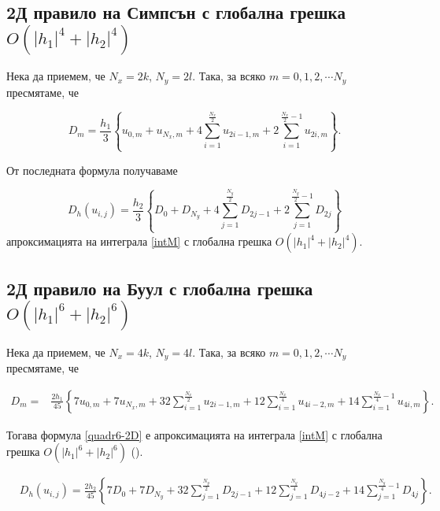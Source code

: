 \documentclass{article}
\newcommand{\rf}[1]{(\ref{#1})}
\begin{document}
\subsection{ 2Д правило на Симпсън с глобална грешка $O(|h_1|^4+|h_2|^4)$}

Нека да приемем, че $N_x=2k$, $N_y=2 l$. Така, за всяко $m=0,1,2,\cdots N_y$ пресмятаме, че

$$D_m= \frac{h_1 }{3} 
\left\{ u_{0,m}+u_{N_x,m}+ 4 \sum_{i=1}^{\frac{N_x}{2}}   u_{2i-1,m}
 +2 \sum_{i=1}^{\frac{N_x}{2}-1} u_{2i,m} \right\}.$$


От последната формула получаваме

\begin{equation}\label{quadr4}
D_h(u_{i,j}) =\frac{h_2 }{3} 
\left\{ D_{0}+D_{N_y}+ 4 \sum_{j=1}^{\frac{N_y}{2}}   D_{2j-1}
 +2 \sum_{j=1}^{{\frac{N_y}{2}}-1} D_{2j} \right\}
\end{equation}
апроксимацията на интеграла \eqref{intM} с глобална грешка $O(|h_1|^4+|h_2|^4)$.


\subsection{ 2Д правило на Буул с глобална грешка $O(|h_1|^6+|h_2|^6)$}

Нека да приемем, че $N_x=4k$, $N_y=4 l$. Така, за всяко $m=0,1,2,\cdots N_y$ пресмятаме, че

\begin{align*}
D_m =& \frac{2h_1}{45} 
\left\{
7u_{0,m}+7u_{N_x,m}+32 \sum_{i=1}^{\frac{N_x}{2}}u_{2i-1,m}
+12\sum_{i=1}^{\frac{N_x}{4}}u_{4i-2,m}
+14 \sum_{i=1}^{\frac{N_x}{4}-1}u_{4i,m}
\right\}.
\end{align*}

Тогава формула \eqref{quadr6-2D} е апроксимацията на интеграла \eqref{intM} с глобална грешка $O(|h_1|^6+|h_2|^6)$ (\cite{boole}).

\begin{align}\label{quadr6-2D}
&D_h(u_{i,j})  =
\frac{2h_2}{45} 
\left\{
7D_{0}+7D_{N_y}+32 \sum_{j=1}^{\frac{N_y}{2}}D_{2j-1}
+12\sum_{j=1}^{\frac{N_y}{4}}D_{4j-2}
+14 \sum_{j=1}^{\frac{N_y}{4}-1}D_{4j}
\right\}.
\end{align}
%
%
\end{document}
